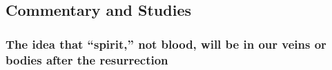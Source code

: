 
	
	
	
	
\subsection{Commentary and Studies} %
	\label{BLOOD-COMMENTARY}

	
		
	\subsubsection{The idea that ``spirit,'' not blood, will be in our veins or bodies after the resurrection}
		\label{BLOOD-spirit}
		
